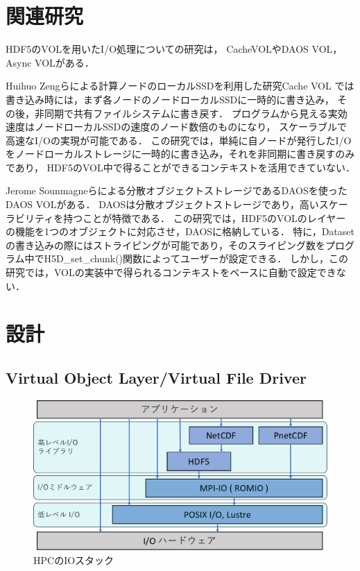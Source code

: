 \documentclass[submit,techrep,noauthor]{ipsj}
\begin{document}
\section{関連研究}

HDF5のVOLを用いたI/O処理についての研究は，
CacheVOL\cite{zheng2022hdf5}やDAOS VOL\cite{soumagne2021accelerating}，Async VOL\cite{tang2021transparent}がある．

Huihuo Zengらによる計算ノードのローカルSSDを利用した研究Cache VOL\cite{zheng2022hdf5}
では書き込み時には，まず各ノードのノードローカルSSDに一時的に書き込み，
その後，非同期で共有ファイルシステムに書き戻す．
プログラムから見える実効速度はノードローカルSSDの速度のノード数倍のものになり，
スケーラブルで高速なI/Oの実現が可能である．
この研究では，単純に自ノードが発行したI/Oをノードローカルストレージに一時的に書き込み，それを非同期に書き戻すのみであり，
HDF5のVOL中で得ることができるコンテキストを活用できていない．

Jerome Sounmagneらによる分散オブジェクトストレージであるDAOS\cite{Breitenfeld2017DAOSFE}を使ったDAOS VOL\cite{soumagne2021accelerating}がある．
DAOSは分散オブジェクトストレージであり，高いスケーラビリティを持つことが特徴である．
この研究では，HDF5のVOLのレイヤーの機能を1つのオブジェクトに対応させ，DAOSに格納している．
特に，Datasetの書き込みの際にはストライピングが可能であり，そのスライピング数をプログラム中でH5D\_set\_chunk()関数によってユーザーが設定できる．
しかし，この研究では，VOLの実装中で得られるコンテキストをベースに自動で設定できない．

\section{設計}
\subsection{Virtual Object Layer/Virtual File Driver}
\begin{figure}[t]
	\centering
	\includegraphics[page=1,width=\linewidth]{figure-crop.pdf}
	\caption{HPCのIOスタック}
	\label{fig:iotstack}
\end{figure}
\end{document}
